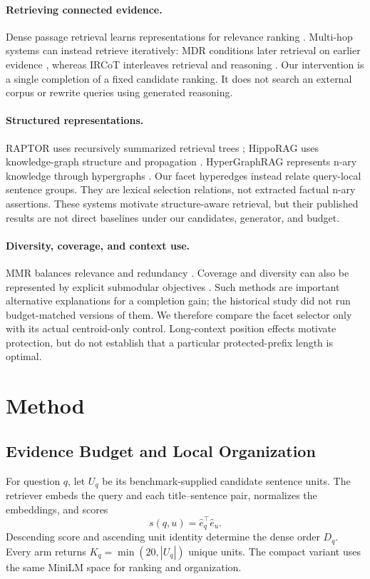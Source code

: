 \documentclass[11pt]{article}
\begin{document}
\paragraph{Retrieving connected evidence.}
Dense passage retrieval learns representations for relevance ranking
\citep{karpukhin2020dpr}. Multi-hop systems can instead retrieve iteratively:
MDR conditions later retrieval on earlier evidence \citep{xiong2021mdr},
whereas IRCoT interleaves retrieval and reasoning
\citep{trivedi2023ircot}. Our intervention is a single completion of a fixed
candidate ranking. It does not search an external corpus or rewrite queries
using generated reasoning.

\paragraph{Structured representations.}
RAPTOR uses recursively summarized retrieval trees
\citep{sarthi2024raptor}; HippoRAG uses knowledge-graph structure and
propagation \citep{gutierrez2024hipporag}. HyperGraphRAG represents n-ary
knowledge through hypergraphs \citep{luo2025hypergraphrag}. Our facet
hyperedges instead relate query-local sentence groups. They are lexical
selection relations, not extracted factual n-ary assertions. These systems
motivate structure-aware retrieval, but their published results are not direct
baselines under our candidates, generator, and budget.

\paragraph{Diversity, coverage, and context use.}
MMR balances relevance and redundancy \citep{carbonell1998mmr}.
Coverage and diversity can also be represented by explicit submodular
objectives \citep{lin2011submodular}. Such methods are important alternative
explanations for a completion gain; the historical study did not run
budget-matched versions of them. We therefore compare the facet selector only
with its actual centroid-only control. Long-context position effects
\citep{liu2024lostmiddle} motivate protection, but do not establish that a
particular protected-prefix length is optimal.

\section{Method}
\subsection{Evidence Budget and Local Organization}
For question $q$, let $U_q$ be its benchmark-supplied candidate sentence
units. The retriever embeds the query and each title--sentence pair, normalizes
the embeddings, and scores
\begin{equation}
s(q,u)=\hat e_q^\top\hat e_u.
\end{equation}
Descending score and ascending unit identity determine the dense order $D_q$.
Every arm returns $K_q=\min(20,|U_q|)$ unique units.
The compact variant uses the same MiniLM space for ranking and organization.
\end{document}
